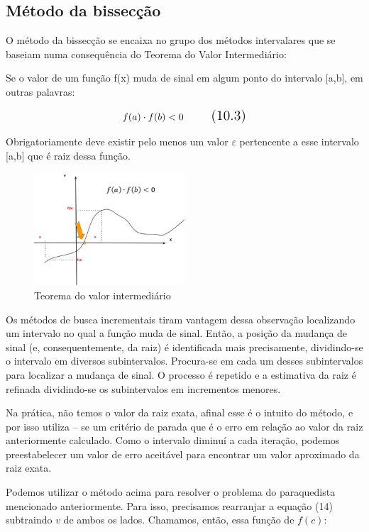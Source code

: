 \subsection{Método da bissecção}

O método da bissecção se encaixa no grupo dos métodos intervalares que se baseiam numa consequência do Teorema do Valor Intermediário:

Se o valor de um função f(x) muda de sinal em algum ponto do intervalo [a,b], em outras palavras:

\begin{equation}
\Large f(a) \cdot f(b)<0
\tag{10.3}
\end{equation}

Obrigatoriamente deve existir pelo menos um valor $\varepsilon$ pertencente a esse intervalo [a,b] que é raiz dessa função.

\begin{figure}[H]
	\centering
	\includegraphics[width=0.5\textwidth]{./Imagens/Bissec/bi1.png} 
	\caption{Teorema do valor intermediário}
	\label{fig:OHS1}
\end{figure}

Os métodos de busca incrementais tiram vantagem dessa observação localizando um intervalo no qual a função muda de sinal. Então, a posição da mudança de sinal (e, consequentemente, da raiz) é identificada mais precisamente, dividindo-se o intervalo em diversos subintervalos. Procura-se em cada um desses subintervalos para localizar a mudança de sinal. O processo é repetido e a estimativa da raiz é refinada dividindo-se os subintervalos em incrementos menores.

Na prática, não temos o valor da raiz exata, afinal esse é o intuito do método, e por isso utiliza – se um critério de parada que é o erro em relação ao valor da raiz anteriormente calculado. Como o intervalo diminuí a cada iteração, podemos preestabelecer um valor de erro aceitável para encontrar um valor aproximado da raiz exata.

Podemos utilizar o método acima para resolver o problema do paraquedista mencionado anteriormente.  Para isso, precisamos rearranjar a equação (14) subtraindo $v$ de ambos os lados. Chamamos, então, essa função de $f(c)$:

